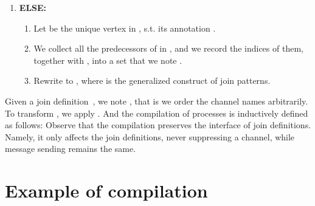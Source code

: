 \documentclass{LMCS}
\renewcommand{\_}{\mathord{\rule[-.25ex]{1ex}{.15ex}}}
\begin{document}
\begin{enumerate}[\ ]
\begin{enumerate}[\ ]
  \item {\bf ELSE:}\hspace*{1cm}
    \begin{enumerate}[(1)]
    \item Let  be the unique vertex in , s.t.  its
      annotation .
    \item We collect all the predecessors of  in , and
      we record the indices of them, together with , into a set
      that we note .
    \item Rewrite to ,
      where  is the generalized  construct of
      join patterns.
    \end{enumerate}
    \end{enumerate}
    \end{enumerate}


Given a join definition~, we note  , that is we order the channel names arbitrarily.
To transform , we apply . And the compilation of
processes  is inductively defined as follows: 
Observe that the compilation preserves the interface of join
definitions. Namely, it only affects the join definitions, never
suppressing a channel, while message sending remains the same.

\section{Example of compilation}
\label{sec.example}
\end{document}
